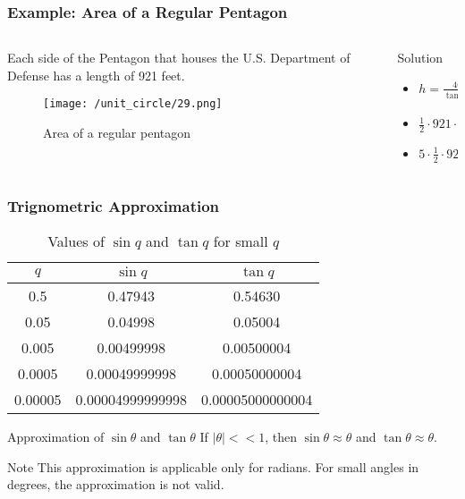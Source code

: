     \begin{frame}
        \frametitle{Example: Area of a Regular Pentagon}
    \begin{columns}
        \begin{column}{0.5\textwidth}
            Each side of the Pentagon that houses the U.S. Department of Defense has a length of 921 feet.
            \begin{figure}
                \centering
                \texttt{[image: /unit\_circle/29.png]}
                \caption{Area of a regular pentagon}
            \end{figure}
        \end{column}
        \begin{column}{0.5\textwidth}
            \begin{block}{Solution}
                \begin{itemize}
                    \item \(h = \frac{460.5}{\tan (\frac{\pi}{5})}\) 
                    \item \(\frac{1}{2} \cdot 921 \cdot h\)
                    \item \(5 \cdot \frac{1}{2} \cdot 921 \cdot h\)
                \end{itemize}
            \end{block}
        \end{column}
    \end{columns}
    \end{frame}

    \begin{frame}
    \frametitle{Trignometric Approximation}

    \begin{table}[h]
        \centering
        \begin{tabular}{|c|c|c|}
            \hline
            $q$ & $\sin q$ & $\tan q$ \\
            \hline
            0.5 & 0.47943 & 0.54630 \\
            0.05 & 0.04998 & 0.05004 \\
            0.005 & 0.00499998 & 0.00500004 \\
            0.0005 & 0.00049999998 & 0.00050000004 \\
            0.00005 & 0.00004999999998 & 0.00005000000004 \\
            \hline
        \end{tabular}
        \caption{Values of $\sin q$ and $\tan q$ for small $q$}
    \end{table}

    \begin{block}{Approximation of \(\sin \theta\) and \(\tan \theta\)}
        If \(| \theta | << 1\), then \(\sin \theta \approx \theta\) and \(\tan \theta \approx \theta\).
    \end{block}
    \begin{block}{Note}
        This approximation is applicable only for radians. For small angles in degrees, the approximation is not valid.
    \end{block}

    \end{frame}

